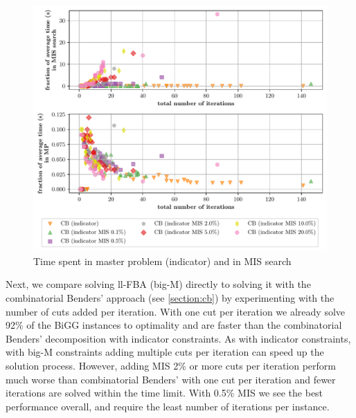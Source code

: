 \begin{figure}[h!]
    \centering
    \includegraphics[width=1.0\textwidth]{Images/mis_comparison_time_vs_iterations.pdf}
    \caption{Time spent in master problem (indicator) and in MIS search}
    \label{fig:mis_comparison_time_vs_iterations}
\end{figure}

\clearpage
Next, we compare solving \textsf{ll-FBA (big-M)} directly to solving it with the combinatorial Benders' approach (see \cref{section:cb}) by experimenting with the number of cuts added per iteration. With one cut per iteration we already solve 92\% of the BiGG instances to optimality and are faster than the combinatorial Benders' decomposition with indicator constraints. As with indicator constraints, with big-M constraints adding multiple cuts per iteration can speed up the solution process. However, adding MIS 2\% or more cuts per iteration perform much worse than combinatorial Benders' with one cut per iteration and fewer iterations are solved within the time limit. With 0.5\% MIS we see the best performance overall, and require the least number of iterations per instance.  

